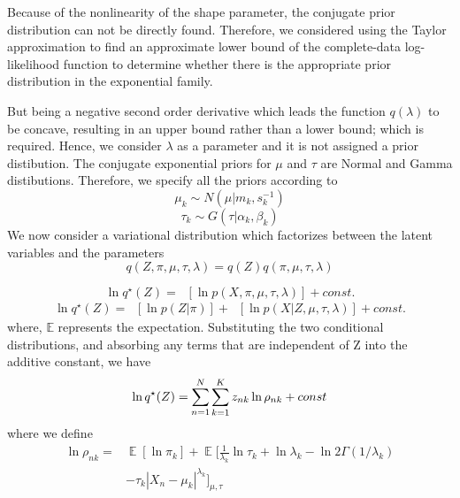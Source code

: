 \documentclass[conference]{IEEEtran}
\begin{document}
Because of the nonlinearity of the shape parameter, the conjugate prior distribution can not be directly found. Therefore, we considered using the Taylor approximation to find an 
approximate lower bound of the complete-data log-likelihood function to determine whether there is the appropriate prior distribution in the exponential family. 

But being a negative second order derivative which leads the function $q(\lambda)$ to be concave, resulting in an upper bound rather than a lower bound; which is required.
Hence, we consider $\lambda$ as a parameter and it is not assigned a prior distibution\cite{b5}.
The conjugate exponential priors for $\mu$ and $\tau$ are Normal and Gamma distibutions. Therefore, we specify all the priors according to
\begin{equation}
    \mu_k \sim N(\mu| m_k, s_k^{-1})   
\end{equation}
\begin{equation}
    \tau_k \sim G(\tau|\alpha_k, \beta_k)    
\end{equation}
We now consider a variational distribution which factorizes between the latent
variables and the parameters
\begin{equation}
    q(Z, \pi, \mu, \tau, \lambda) = q(Z)q(\pi, \mu, \tau, \lambda)
\end{equation}

\begin{equation}
    \ln q^\star(Z) = \mathop{\mathbb{E}_{\mu, \tau, \pi}}[\ln p(X, \pi,\mu, \tau, \lambda)] + const.
\end{equation}
\begin{equation}
    \begin{split}
        \ln q^\star(Z) = \mathop{\mathbb{E_\pi}}[\ln p(Z|\pi)]+\mathop{\mathbb{E_{\mu, \tau}}}[\ln p(X|Z,\mu, \tau, \lambda)] + const.
    \end{split}
\end{equation}
where, $\mathbb{E}$ represents the expectation.
Substituting the two conditional distributions, and absorbing any terms that are independent of Z into the additive constant, we have
\begin{equation}
    \ln q^\star(Z) =  \sum_{\mathclap{n=1}}^{N} \sum_{\mathclap{k=1}}^{K}z_{nk} \ln \rho_{nk} + const
\end{equation}
where we define
\begin{equation}
    \begin{split}\label{rownk}
        \ln \rho_{nk} = &\mathop{\mathbb{E}}[\ln \pi_k] + \mathop{\mathbb{E}}[\frac{1}{\lambda_k} \ln \tau_k + \ln \lambda_k - \ln 2\Gamma(1/\lambda_k)\\
        & - \tau_k |X_n - \mu_k|^{\lambda_k}]_{\mu, \tau}    
    \end{split}
\end{equation}
\end{document}
